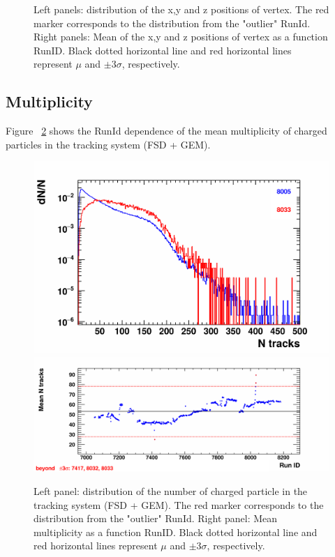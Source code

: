 \begin{figure}[H]
\begin{center}
            \vspace{-3mm}
            \caption{Left panels: distribution of the x,y and z positions of vertex. The red marker corresponds to the distribution from the "outlier" RunId. Right panels: Mean of the x,y and z positions of vertex as a function RunID. Black dotted horizontal line and red horizontal lines represent $\mu$ and $\pm3\sigma$, respectively.}
            \label{fig:Vertex}
        \end{center}
        \vspace{-5mm}
    \end{figure}




\subsection{Multiplicity}

    Figure ~\ref{fig:mult} shows the RunId dependence of the mean multiplicity of charged particles in the tracking system (FSD + GEM).

    \begin{figure}[H]
        \begin{center}
            \includegraphics[width=0.35\linewidth]{../pict/QA_RunByRun_24.12/H1/nVtxTr_h2_RunId_nTracks.png}
            \includegraphics[width=0.60\linewidth]{../pict/QA_RunByRun_24.12/nVtxTr_h2_RunId_nTracks.png}
            \vspace{-3mm}
            \caption{Left panel: distribution of the number of charged particle in the tracking system (FSD + GEM). The red marker corresponds to the distribution from the "outlier" RunId. Right panel: Mean multiplicity as a function RunID. Black dotted horizontal line and red horizontal lines represent $\mu$ and $\pm3\sigma$, respectively.}
            \label{fig:mult}
        \end{center}
        \vspace{-5mm}
    \end{figure}




